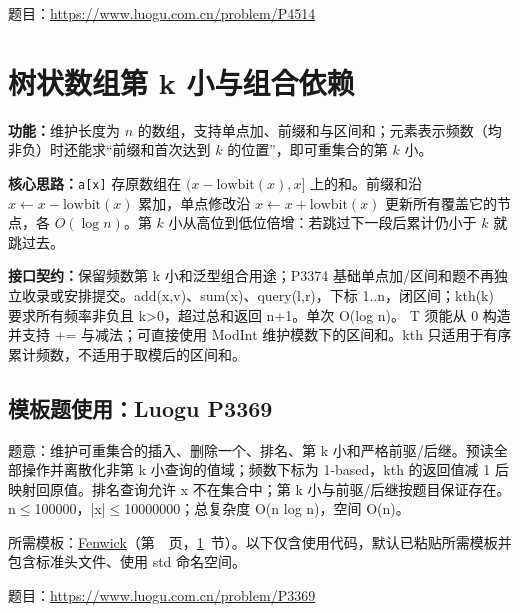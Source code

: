题目：\url{https://www.luogu.com.cn/problem/P4514}



\Needspace{582pt}

\section{树状数组第 k 小与组合依赖}\label{compact-Fenwick}

\noindent\textbf{功能：}\allowbreak 维护长度为 $n$ 的数组，支持单点加、前缀和与区间和；元素表示频数（均非负）时还能求“前缀和首次达到 $k$ 的位置”，即可重集合的第 $k$ 小。

\textbf{核心思路：}\allowbreak \texttt{a[x]} 存原数组在 $(x-\mathrm{lowbit}(x),x]$ 上的和。前缀和沿 $x\leftarrow x-\mathrm{lowbit}(x)$ 累加，单点修改沿 $x\leftarrow x+\mathrm{lowbit}(x)$ 更新所有覆盖它的节点，各 $O(\log n)$。第 $k$ 小从高位到低位倍增：若跳过下一段后累计仍小于 $k$ 就跳过去。



{\sloppy{}\noindent\textbf{接口契约：}保留频数第 k 小和泛型组合用途；P3374 基础单点加/区间和题不再独立收录或安排提交。add(x,v)、sum(x)、query(l,r)，下标 1..n，闭区间；kth(k) 要求所有频率非负且 k>0，超过总和返回 n+1。单次 O(log n)。 T 须能从 0 构造并支持 += 与减法；可直接使用 ModInt 维护模数下的区间和。kth 只适用于有序累计频数，不适用于取模后的区间和。\par}



\Needspace{614pt}

\subsection*{模板题使用：Luogu P3369}

\label{usage-example-210}

题意：维护可重集合的插入、删除一个、排名、第 k 小和严格前驱/后继。预读全部操作并离散化非第 k 小查询的值域；频数下标为 1-based，kth 的返回值减 1 后映射回原值。排名查询允许 x 不在集合中；第 k 小与前驱/后继按题目保证存在。n$\le$100000，|x|$\le$10000000；总复杂度 O(n log n)，空间 O(n)。

所需模板：\hyperref[compact-Fenwick]{Fenwick}（第~\pageref{compact-Fenwick}~页，\ref{compact-Fenwick}~节）。以下仅含使用代码，默认已粘贴所需模板并包含标准头文件、使用 std 命名空间。

题目：\url{https://www.luogu.com.cn/problem/P3369}

